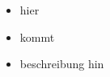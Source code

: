 \begin{frame}[allowframebreaks]
\vspace{4cm}
			\begin{columns}[t]
				\column[]{4cm}
				\begin{itemize}
					\item hier
					\item kommt
					\item beschreibung hin
				\end{itemize}
				\column[]{8cm}
				\begin{figure}[htp]
					\centering		
					
				\end{figure}
			\end{columns}
		\end{frame}
